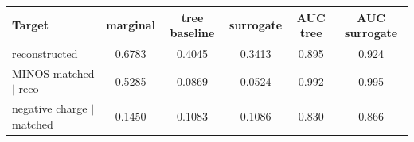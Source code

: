 \begin{tabular}{lccccc}
\toprule
Target & marginal & tree baseline & surrogate & AUC tree & AUC surrogate \\
\midrule
reconstructed & 0.6783 & 0.4045 & 0.3413 & 0.895 & 0.924 \\
MINOS matched $\mid$ reco & 0.5285 & 0.0869 & 0.0524 & 0.992 & 0.995 \\
negative charge $\mid$ matched & 0.1450 & 0.1083 & 0.1086 & 0.830 & 0.866 \\
\bottomrule
\end{tabular}
